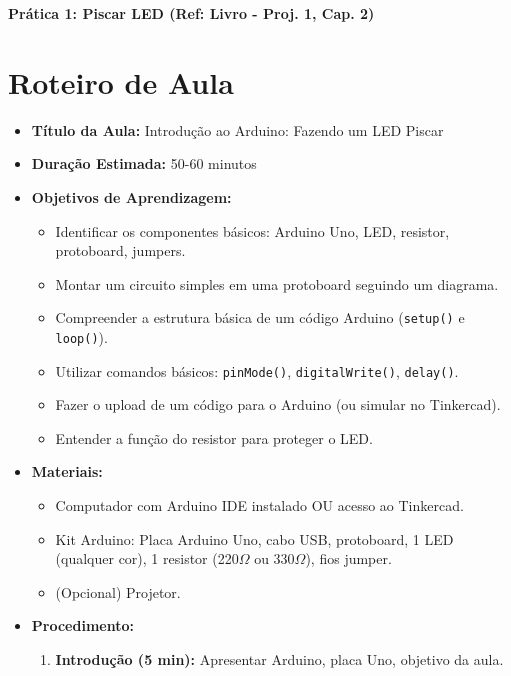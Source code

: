 \documentclass[a4paper,12pt]{article}
\begin{document}
\begin{center}
    \textbf{\Large Prática 1: Piscar LED (Ref: Livro - Proj. 1, Cap. 2)}
\end{center}

\vspace{1cm}

\section*{Roteiro de Aula}

\begin{itemize}
    \item \textbf{Título da Aula:} Introdução ao Arduino: Fazendo um LED Piscar
    \item \textbf{Duração Estimada:} 50-60 minutos
    \item \textbf{Objetivos de Aprendizagem:}
    \begin{itemize}
        \item Identificar os componentes básicos: Arduino Uno, LED, resistor, protoboard, jumpers.
        \item Montar um circuito simples em uma protoboard seguindo um diagrama.
        \item Compreender a estrutura básica de um código Arduino (\texttt{setup()} e \texttt{loop()}).
        \item Utilizar comandos básicos: \texttt{pinMode()}, \texttt{digitalWrite()}, \texttt{delay()}.
        \item Fazer o upload de um código para o Arduino (ou simular no Tinkercad).
        \item Entender a função do resistor para proteger o LED.
    \end{itemize}
    \item \textbf{Materiais:}
    \begin{itemize}
        \item Computador com Arduino IDE instalado OU acesso ao Tinkercad.
        \item Kit Arduino: Placa Arduino Uno, cabo USB, protoboard, 1 LED (qualquer cor), 1 resistor (220$\Omega$ ou 330$\Omega$), fios jumper.
        \item (Opcional) Projetor.
    \end{itemize}
    \item \textbf{Procedimento:}
    \begin{enumerate}
        \item \textbf{Introdução (5 min):} Apresentar Arduino, placa Uno, objetivo da aula.

\end{enumerate}
\end{itemize}
\end{document}
